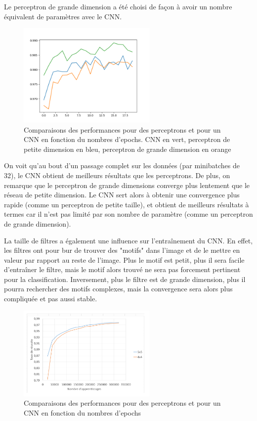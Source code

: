 Le perceptron de grande dimension a été choisi de façon à avoir un nombre équivalent de paramètres avec le CNN.


\begin{figure}[h]
    \center 
    \includegraphics[width=0.6\textwidth]{img/fc_vs_cnn.png}
    \caption{Comparaisons des performances pour des perceptrons et pour un CNN en fonction du nombres d'epochs. 
    CNN en vert, perceptron de petite dimension en bleu, perceptron de grande dimension en orange}
\end{figure}

On voit qu'au bout d'un passage complet sur les données (par minibatches de 32), le CNN obtient de meilleurs résultats que les 
perceptrons. De plus, on remarque que le perceptron de grande dimensions converge plus lentement que le réseau de petite dimension.
Le CNN sert alors à obtenir une convergence plus rapide (comme un perceptron de petite taille),
et obtient de meilleurs résultats à termes car il n'est pas limité par son nombre de paramètre (comme un perceptron de grande dimension).

\newpage
La taille de filtres a également une influence sur l'entraînement du CNN. En effet, les filtres ont pour bur de trouver des "motifs" dans l'image 
et de le mettre en valeur par rapport au reste de l'image. Plus le motif est petit, plus il sera facile d'entraîner le filtre, mais 
le motif alors trouvé ne sera pas forcement pertinent pour la classification. Inversement, plus le filtre est de grande dimension, plus 
il pourra rechercher des motifs complexes, mais la convergence sera alors plus compliquée et pas aussi stable.


\begin{figure}[h]
    \center 
    \includegraphics[width=0.6\textwidth]{img/comparaison_filtres.png}
    \caption{Comparaisons des performances pour des perceptrons et pour un CNN en fonction du nombres d'epochs}
\end{figure}

